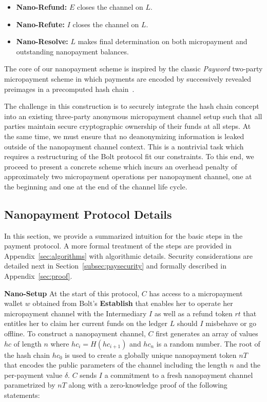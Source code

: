 \begin{itemize}
\item \textbf{Nano-Refund:} $E$ closes the channel on $L$.
\item \textbf{Nano-Refute:} $I$ closes the channel on $L$.
\item \textbf{Nano-Resolve:} $L$ makes final determination on both micropayment
  and outstanding nanopayment balances.
\end{itemize}

The core of our nanopayment scheme is inspired by the classic \emph{Payword}
two-party micropayment scheme in which payments are encoded by successively
revealed preimages in a precomputed hash chain~\cite{rivest1996payword}.

The challenge in this construction is to securely integrate the hash chain
concept into an existing three-party anonymous micropayment channel setup such
that all parties maintain secure cryptographic ownership of their funds at all
steps. At the same time, we must ensure that no deanonymizing information is
leaked outside of the nanopayment channel context. This is a nontrivial task
which requires a restructuring of the Bolt protocol fit our constraints. To this
end, we proceed to present a concrete scheme which incurs an overhead penalty of
approximately two micropayment operations per nanopayment channel, one at the
beginning and one at the end of the channel life cycle.

\subsection{Nanopayment Protocol Details}
\label{sec:nanopaymentdetails}
In this section, we provide a summarized intuition for the basic steps in the
payment protocol. A more formal treatment of the steps are provided in
Appendix~\ref{sec:algorithms} with algorithmic details. Security considerations
are detailed next in Section~\ref{subsec:paysecurity} and formally described in
Appendix~\ref{sec:proof}.

\medskip
\noindent\textbf{Nano-Setup} At the start of this protocol, $C$ has access to a
micropayment wallet $w$ obtained from Bolt's \textbf{Establish} that enables her
to operate her micropayment channel with the Intermediary $I$ as well as a
refund token $rt$ that entitles her to claim her current funds on the ledger $L$
should $I$ misbehave or go offline. To construct a nanopayment channel, $C$
first generates an array of values $hc$ of length $n$ where $hc_i = H(hc_{i+1})$
and $hc_n$ is a random number. The root of the hash chain $hc_0$ is used to
create a globally unique nanopayment token $nT$ that encodes the public
parameters of the channel including the length $n$ and the per-payment value
$\delta$. $C$ sends $I$ a commitment to a fresh nanopayment channel parametrized
by $nT$ along with a zero-knowledge proof of the following statements:

